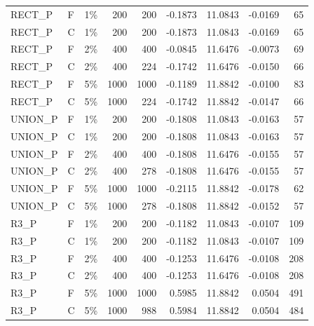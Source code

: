 {\begin{longtable}{llrrrrrrr}
RECT\_P & F & 1\% & 200 & 200 & -0.1873 & 11.0843 & -0.0169 & 65 \\
RECT\_P & C & 1\% & 200 & 200 & -0.1873 & 11.0843 & -0.0169 & 65 \\
RECT\_P & F & 2\% & 400 & 400 & -0.0845 & 11.6476 & -0.0073 & 69 \\
RECT\_P & C & 2\% & 400 & 224 & -0.1742 & 11.6476 & -0.0150 & 66 \\
RECT\_P & F & 5\% & 1000 & 1000 & -0.1189 & 11.8842 & -0.0100 & 83 \\
RECT\_P & C & 5\% & 1000 & 224 & -0.1742 & 11.8842 & -0.0147 & 66 \\
UNION\_P & F & 1\% & 200 & 200 & -0.1808 & 11.0843 & -0.0163 & 57 \\
UNION\_P & C & 1\% & 200 & 200 & -0.1808 & 11.0843 & -0.0163 & 57 \\
UNION\_P & F & 2\% & 400 & 400 & -0.1808 & 11.6476 & -0.0155 & 57 \\
UNION\_P & C & 2\% & 400 & 278 & -0.1808 & 11.6476 & -0.0155 & 57 \\
UNION\_P & F & 5\% & 1000 & 1000 & -0.2115 & 11.8842 & -0.0178 & 62 \\
UNION\_P & C & 5\% & 1000 & 278 & -0.1808 & 11.8842 & -0.0152 & 57 \\
R3\_P & F & 1\% & 200 & 200 & -0.1182 & 11.0843 & -0.0107 & 109 \\
R3\_P & C & 1\% & 200 & 200 & -0.1182 & 11.0843 & -0.0107 & 109 \\
R3\_P & F & 2\% & 400 & 400 & -0.1253 & 11.6476 & -0.0108 & 208 \\
R3\_P & C & 2\% & 400 & 400 & -0.1253 & 11.6476 & -0.0108 & 208 \\
R3\_P & F & 5\% & 1000 & 1000 & 0.5985 & 11.8842 & 0.0504 & 491 \\
R3\_P & C & 5\% & 1000 & 988 & 0.5984 & 11.8842 & 0.0504 & 484 \\
\bottomrule
\end{longtable}

}
